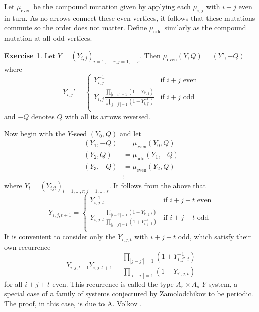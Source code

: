 \documentclass{amsart}
\theoremstyle{definition}
\newtheorem{exercise}[theorem]{Exercise}
\theoremstyle{remark}
\numberwithin{equation}{section}
\begin{document}
	Let $\mu_{\textrm{even}}$ be the compound mutation given by applying each $\mu_{i,j}$ with $i+j$ even in turn.  As no arrows connect these even vertices, it follows that these mutations commute so the order does not matter.  Define $\mu_{\textrm{odd}}$ similarly as the compound mutation at all odd vertices.
	
	\begin{exercise}
		Let $Y = (Y_{i,j})_{i=1,\ldots, r; j=1,\ldots, s}$.  Then $\mu_{\textrm{even}}(Y,Q) = (Y',-Q)$ where
		\begin{equation} \label{eq:YSystemCases}
			Y_{i,j}' = \begin{cases}
			Y_{i,j}^{-1} & \textrm{if $i+j$ even} \\
			Y_{i,j}\frac{\displaystyle\prod_{|i-i'|=1}(1+Y_{i',j})}{\displaystyle\prod_{|j-j'|=1}(1+Y_{i,j'}^{-1})} & \textrm{if $i+j$ odd} \\
			\end{cases}
		\end{equation}
		and $-Q$ denotes $Q$ with all its arrows reversed.
	\end{exercise}
	
	Now begin with the $Y$-seed $(Y_0,Q)$ and let 
	\begin{align*}
	(Y_1,-Q) &= \mu_{\textrm{even}}(Y_0,Q) \\ 
	(Y_2,Q) &= \mu_{\textrm{odd}}(Y_1,-Q) \\ 
	(Y_3,-Q) &= \mu_{\textrm{even}}(Y_2,Q) \\ 
	&\vdots
	\end{align*}
	where $Y_t = (Y_{ijt})_{i=1,\ldots, r; j=1,\ldots, s}$.  It follows from the above that
	\begin{displaymath}
		Y_{i,j,t+1} = \begin{cases}
		Y_{i,j,t}^{-1} & \textrm{if $i+j+t$ even} \\
		Y_{i,j,t}\frac{\displaystyle\prod_{|i-i'|=1}(1+Y_{i',j,t})}{\displaystyle\prod_{|j-j'|=1}(1+Y_{i,j',t}^{-1})} & \textrm{if $i+j+t$ odd} \\
		\end{cases}
	\end{displaymath}
	It is convenient to consider only the $Y_{i,j,t}$ with $i+j+t$ odd, which satisfy their own recurrence
	\begin{equation} \label{eq:YSystem}
		Y_{i,j,t-1}Y_{i,j,t+1} = \frac{\displaystyle\prod_{|j-j'|=1}(1+Y_{i,j',t}^{-1})}{\displaystyle\prod_{|i-i'|=1}(1+Y_{i',j,t})}
	\end{equation}
	for all $i+j+t$ even.  This recurrence is called the type $A_r \times A_s$ $Y$-system, a special case of a family of systems conjectured by Zamolodchikov to be periodic.  The proof, in this case, is due to A. Volkov \cite{V07}.
	
\end{document}
